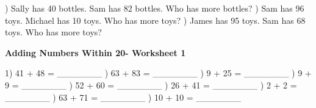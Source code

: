 \documentclass{article}%
\begin{document}
) Sally has 40 bottles. Sam has 82 bottles. Who has more bottles?%
\newline%
\newline%
) Sam has 96 toys. Michael has 10 toys. Who has more toys?%
\newline%
\newline%
) James has 95 toys. Sam has 68 toys. Who has more toys?%
\newline%
\newline%
\newline%
\pagebreak%
\large%
\begin{center}%
\textbf{Adding Numbers Within 20- Worksheet 1}%
\newline%
\newline%
\newline%
\end{center} \normalsize%
1) 41 + 48 = \_\_\_\_\_\_\_%
\newline%
\newline%
) 63 + 83 = \_\_\_\_\_\_\_%
\newline%
\newline%
) 9 + 25 = \_\_\_\_\_\_\_%
\newline%
\newline%
) 9 + 9 = \_\_\_\_\_\_\_%
\newline%
\newline%
) 52 + 60 = \_\_\_\_\_\_\_%
\newline%
\newline%
) 26 + 41 = \_\_\_\_\_\_\_%
\newline%
\newline%
) 2 + 2 = \_\_\_\_\_\_\_%
\newline%
\newline%
) 63 + 71 = \_\_\_\_\_\_\_%
\newline%
\newline%
) 10 + 10 = \_\_\_\_\_\_\_%
\newline%
\newline%
\newline%
\end{document}
